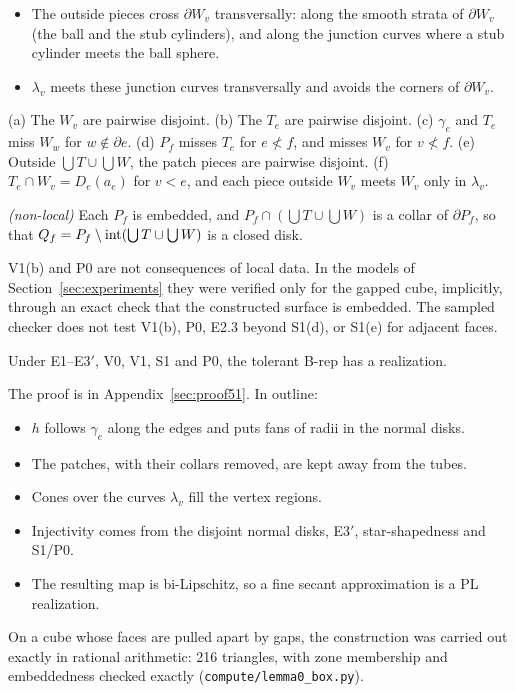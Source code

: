 \begin{description}
\begin{itemize}
\item The outside pieces cross $\partial W_v$ transversally: along the smooth strata of $\partial W_v$ (the ball and the
stub cylinders), and along the junction curves where a stub cylinder meets the ball sphere.
\item $\lambda_v$ meets these junction curves transversally and avoids the corners of $\partial W_v$.
\end{itemize}
\item[S1] (a) The $W_v$ are pairwise disjoint. (b) The $T_e$ are pairwise disjoint. (c) $\gamma_e$ and $T_e$ miss $W_w$
for $w\notin\partial e$. (d) $P_f$ misses $T_e$ for $e\not<f$, and misses $W_v$ for $v\not<f$. (e) Outside
$\bigcup T\cup\bigcup W$, the patch pieces are pairwise disjoint. (f) $T_e\cap W_v=D_e(a_e)$ for $v<e$, and each
piece outside $W_v$ meets $W_v$ only in $\lambda_v$.
\item[P0] \emph{(non-local)} Each $P_f$ is embedded, and $P_f\cap(\bigcup T\cup\bigcup W)$ is a collar of $\partial
P_f$, so that $Q_f=P_f\setminus\operatorname{int}(\bigcup T\cup\bigcup W)$ is a closed disk.
\end{description}
V1(b) and P0 are not consequences of local data. In the models of Section~\ref{sec:experiments} they were verified
only for the gapped cube, implicitly, through an exact check that the constructed surface is embedded. The
sampled checker does not test V1(b), P0, E2.3 beyond S1(d), or S1(e) for adjacent faces.

\begin{theorem}\label{thm:lemma0}
Under E1--E3$'$, V0, V1, S1 and P0, the tolerant B-rep has a realization.
\end{theorem}
The proof is in Appendix~\ref{sec:proof51}. In outline:
\begin{itemize}
\item $h$ follows $\gamma_e$ along the edges and puts fans of radii in the normal disks.
\item The patches, with their collars removed, are kept away from the tubes.
\item Cones over the curves $\lambda_v$ fill the vertex regions.
\item Injectivity comes from the disjoint normal disks, E3$'$, star-shapedness and S1/P0.
\item The resulting map is bi-Lipschitz, so a fine secant approximation is a PL realization.
\end{itemize}

\begin{example}
On a cube whose faces are pulled apart by gaps, the construction was carried out exactly in rational
arithmetic: 216 triangles, with zone membership and embeddedness checked exactly
(\texttt{compute/lemma0\_box.py}).
\end{example}

